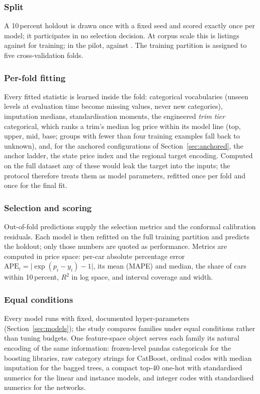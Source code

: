 \documentclass[journal,10pt]{IEEEtran}
\begin{document}
\subsubsection{Split} A 10\,percent holdout is drawn once with a fixed seed and scored exactly once per model; it participates in no selection decision. At corpus scale this is \NHoldout{} listings against \NTrain{} for training; in the pilot, \PilotHoldout{} against \PilotTrain{}. The training partition is assigned to five cross-validation folds.

\subsubsection{Per-fold fitting} Every fitted statistic is learned inside the fold: categorical vocabularies (unseen levels at evaluation time become missing values, never new categories), imputation medians, standardisation moments, the engineered \emph{trim tier} categorical, which ranks a trim's median log price within its model line (top, upper, mid, base; groups with fewer than four training examples fall back to unknown), and, for the anchored configurations of Section~\ref{sec:anchored}, the anchor ladder, the state price index and the regional target encoding. Computed on the full dataset any of these would leak the target into the inputs; the protocol therefore treats them as model parameters, refitted once per fold and once for the final fit.

\subsubsection{Selection and scoring} Out-of-fold predictions supply the selection metrics and the conformal calibration residuals. Each model is then refitted on the full training partition and predicts the holdout; only those numbers are quoted as performance. Metrics are computed in price space: per-car absolute percentage error $\mathrm{APE}_i=\lvert\exp(p_i-y_i)-1\rvert$, its mean (MAPE) and median, the share of cars within 10\,percent, $R^2$ in log space, and interval coverage and width.

\subsubsection{Equal conditions} Every model runs with fixed, documented hyper-parameters (Section~\ref{sec:models}); the study compares families under equal conditions rather than tuning budgets. One feature-space object serves each family its natural encoding of the same information: frozen-level pandas categoricals for the boosting libraries, raw category strings for CatBoost, ordinal codes with median imputation for the bagged trees, a compact top-40 one-hot with standardised numerics for the linear and instance models, and integer codes with standardised numerics for the networks.
\end{document}
